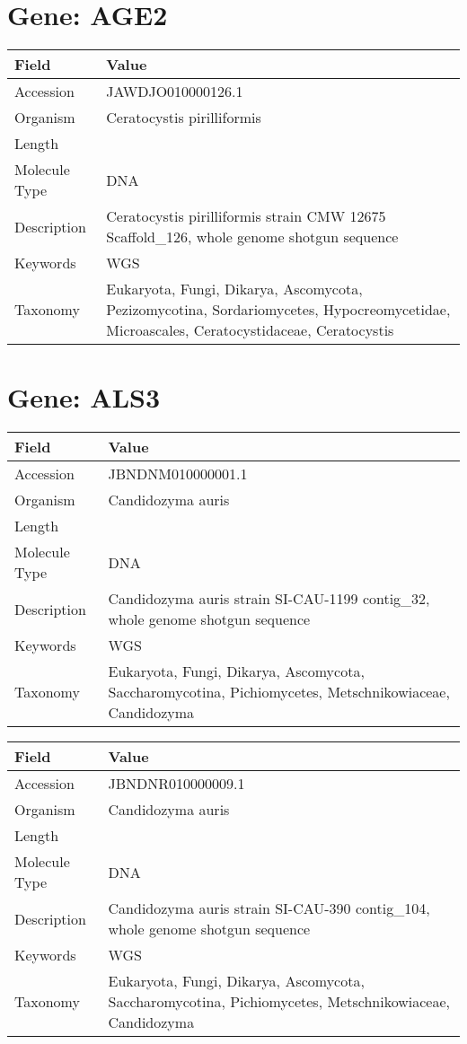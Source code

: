 \documentclass[10pt]{article}
\begin{document}
\section{Gene: AGE2}
{\footnotesize
\begin{longtable}{>{\raggedright\arraybackslash}p{4.5cm} >{\raggedright\arraybackslash}p{11.5cm}}
\textbf{Field} & \textbf{Value} \\
\hline
Accession & JAWDJO010000126.1 \\
Organism & Ceratocystis pirilliformis \\
Length & 68192 \\
Molecule Type & DNA \\
Description & Ceratocystis pirilliformis strain CMW 12675 Scaffold\_126, whole genome shotgun sequence \\
Keywords & WGS \\
Taxonomy & Eukaryota, Fungi, Dikarya, Ascomycota, Pezizomycotina, Sordariomycetes, Hypocreomycetidae, Microascales, Ceratocystidaceae, Ceratocystis \\
\end{longtable}
}

\vspace{1em}
\section{Gene: ALS3}
{\footnotesize
\begin{longtable}{>{\raggedright\arraybackslash}p{4.5cm} >{\raggedright\arraybackslash}p{11.5cm}}
\textbf{Field} & \textbf{Value} \\
\hline
Accession & JBNDNM010000001.1 \\
Organism & Candidozyma auris \\
Length & 780289 \\
Molecule Type & DNA \\
Description & Candidozyma auris strain SI-CAU-1199 contig\_32, whole genome shotgun sequence \\
Keywords & WGS \\
Taxonomy & Eukaryota, Fungi, Dikarya, Ascomycota, Saccharomycotina, Pichiomycetes, Metschnikowiaceae, Candidozyma \\
\end{longtable}
}

\vspace{1em}
{\footnotesize
\begin{longtable}{>{\raggedright\arraybackslash}p{4.5cm} >{\raggedright\arraybackslash}p{11.5cm}}
\textbf{Field} & \textbf{Value} \\
\hline
Accession & JBNDNR010000009.1 \\
Organism & Candidozyma auris \\
Length & 773430 \\
Molecule Type & DNA \\
Description & Candidozyma auris strain SI-CAU-390 contig\_104, whole genome shotgun sequence \\
Keywords & WGS \\
Taxonomy & Eukaryota, Fungi, Dikarya, Ascomycota, Saccharomycotina, Pichiomycetes, Metschnikowiaceae, Candidozyma \\
\end{longtable}
}
\end{document}

